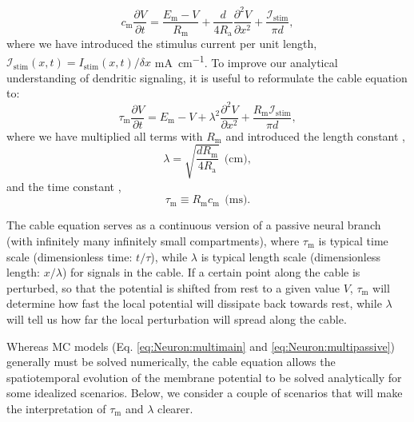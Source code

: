 \begin{equation}
c_\text{m} \frac{\partial V}{\partial t} = \frac{E_\text{m}-V}{R_\text{m}} +  \frac{d}{4 R_\text{a}}  \frac{\partial^2 V}{\partial x^2}  + \frac{\mathcal{I}_{\mathrm{stim}}}{\pi d},
\label{eq:Neuron:cable}
\end{equation}
where we have  introduced the stimulus current per unit length, $\mathcal{I}_{\mathrm{stim}}(x,t) = I_{\mathrm{stim}}(x,t)/\delta x$ \si{\milli\ampere\per\centi\metre}. To improve our analytical understanding of dendritic signaling, it is useful to reformulate the cable equation to:
\begin{equation}
\tau_\text{m} \frac{\partial V}{\partial t} = E_\text{m}-V +   \lambda^2  \frac{\partial^2 V}{\partial x^2}  + \frac{R_\text{m} \mathcal{I}_{\mathrm{stim}} }{\pi d},
\label{eq:Neuron:cable2}
\end{equation}
where we have multiplied all terms with $R_\text{m}$ and introduced the length constant ,
\begin{equation}
\lambda = \sqrt{\frac{d R_\text{m}}{4 R_\text{a}}} \,\; \text{(cm)}, 
\label{eq:Neuron:lengthconst}
\end{equation}
and the time constant , 
\begin{equation}
\tau_\text{m} \equiv R_\text{m} c_\text{m}  \,\; \text{(ms)}.
\label{eq:Neuron:timeconst}
\end{equation}

The cable equation serves as a continuous version of a passive neural branch (with infinitely many infinitely small compartments), where $\tau_\text{m}$ is typical time scale (dimensionless time: $t/\tau$), while $\lambda$  is typical length scale  (dimensionless length: $x/\lambda$) for signals in the cable. If a certain point along the cable is perturbed, so that the potential is shifted from rest to a given value $V$, $\tau_\text{m}$ will determine how fast the local potential will dissipate back towards rest, while $\lambda$ will tell us how far the local perturbation will spread along the cable. 

Whereas MC models (Eq. \ref{eq:Neuron:multimain} and \ref{eq:Neuron:multipassive}) generally must be solved numerically, the cable equation allows the spatiotemporal evolution of the membrane potential to be solved analytically for some idealized scenarios. Below, we consider a couple of scenarios that will  make the interpretation of $\tau_\text{m}$ and $\lambda$ clearer. 


